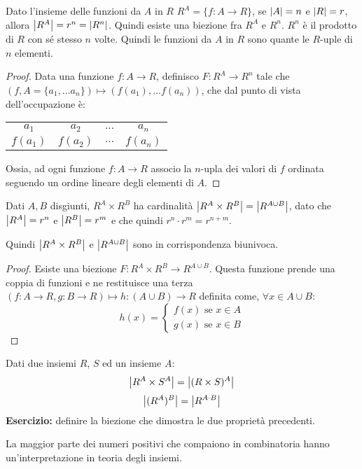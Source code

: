 \begin{prop}
Dato l'insieme delle funzioni da $A$ in $R$ $R^A = \{ f : A \to R\}$, se $\left\lvert{A}\right\rvert = n$ e $\left\lvert{R}\right\rvert = r$, allora $\left\lvert{R^A}\right\rvert = r^n = \left\lvert{R^n}\right\rvert$. Quindi esiste una biezione fra $R^A$ e $R^n$. $R^n$ \`e il prodotto di $R$ con s\'e stesso $n$ volte. Quindi le funzioni da $A$ in $R$ sono quante le $R$-uple di $n$ elementi.
\end{prop}
\begin{proof}
Data una funzione $f : A \to R$, definisco $F : R^A \to R^n$ tale che $(f, A = \{ a_1, \dots a_n\}) \mapsto (f(a_1), \dots f(a_n))$, che dal punto di vista dell'occupazione \`e:

\begin{tabular}{cccc}
$a_1$ & $a_2$ & $\dots$ & $a_n$ \\
$f(a_1)$ & $f(a_2)$ & $\dots$ & $f(a_n)$ 
\end{tabular}

Ossia, ad ogni funzione $f : A \to R$ associo la $n$-upla dei valori di $f$ ordinata seguendo un ordine lineare degli elementi di $A$.
\end{proof}
\begin{prop}
Dati $A, B$ disgiunti, $R^A \times R^B$ ha cardinalit\`a $\left\lvert{R^A \times R^B}\right\rvert = \left\lvert{R^{A \cup B}}\right\rvert$, dato che $\left\lvert{R^A}\right\rvert = r^n$ e $\left\lvert{R^B}\right\rvert = r^m$ e che quindi $r^n \cdot r^m = r^{n + m}$.

Quindi $\left\lvert{R^A \times R^B}\right\rvert $ e $ \left\lvert{R^{A \cup B}}\right\rvert$ sono in corrispondenza biunivoca.
\end{prop}
\begin{proof}
Esiste una biezione $F : R^A \times R^B \to R^{A \cup B}$. Questa funzione prende una coppia di funzioni e ne restituisce una terza $(f : A \to R, g: B \to R) \mapsto h : (A \cup B) \to R$ definita come, $\forall x \in A \cup B$:
\[
h(x) = 
\begin{cases}
f(x) \text{ se } x \in A\\
g(x) \text{ se } x \in B
\end{cases}
\]
\end{proof}
Dati due insiemi $R$, $S$ ed un insieme $A$:
\[
\left\lvert{R^A \times S^A}\right\rvert = \left\lvert{(R \times S)^A}\right\rvert
\]
\[
\left\lvert{(R^A)^B}\right\rvert = \left\lvert{R^{A \cdot B}}\right\rvert
\]
\textbf{Esercizio:} definire la biezione che dimostra le due propriet\`a precedenti.
\vspace{5cm}

La maggior parte dei numeri positivi che compaiono in combinatoria hanno un'interpretazione in teoria degli insiemi.


